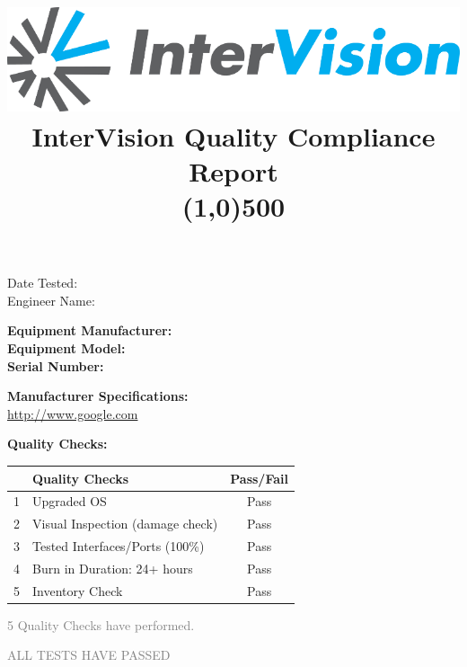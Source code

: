 \documentclass[12pt]{article}
\author{}
\title{\includegraphics[scale=1]{IV_logo.png}
\\InterVision Quality Compliance Report\\\line(1,0){500}\vspace{-8ex}}
\date{}
\begin{document}
\maketitle
\begin{flushright}
Date Tested:\\
Engineer Name: 
\end{flushright}

\begin{flushleft}
\textbf{Equipment Manufacturer: } \\
\textbf{Equipment Model: } \\
\textbf{Serial Number: }
\end{flushleft}

\begin{flushleft}
\textbf{Manufacturer Specifications:}\\
\url{http://www.google.com}\\


\end{flushleft}

\begin{flushleft}
\textbf{Quality Checks:}
\end{flushleft}
\begin{table}[H]
\centering
\begin{tabular}{|c|l|c|}
 \hline
& \textbf{Quality Checks}  & \textbf{Pass/Fail} \\ \hline
1& Upgraded OS & Pass \\ \hline
2& Visual Inspection (damage check) & Pass \\ \hline
3& Tested Interfaces/Ports (100\%) & Pass \\ \hline
4& Burn in Duration: 24+ hours & Pass \\ \hline
5& Inventory Check & Pass \\ \hline
\end{tabular}
\end{table}
\begin{center}
\textcolor{gray}{\huge 5 Quality Checks have performed.}

\textcolor{gray}{\huge ALL TESTS HAVE PASSED}
\end{center}
\end{document}
